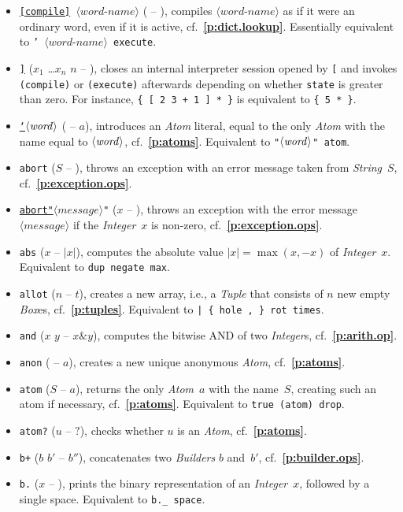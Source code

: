 \documentclass[12pt,oneside]{article}
\def\refpoint#1{{\rm\textbf{\ref{#1}}}}
\let\ptref=\refpoint
\begin{document}
\begin{itemize}
\item {\tt \underline{[compile]} $\langle\textit{word-name}\rangle$} ( -- ), compiles $\langle\textit{word-name}\rangle$ as if it were an ordinary word, even if it is active, cf.~\ptref{p:dict.lookup}. Essentially equivalent to {\tt ' $\langle\textit{word-name}\rangle$ execute}.
\item {\tt \underline{]}} ($x_1$ \dots $x_n$ $n$ -- ), closes an internal interpreter session opened by {\tt [} and invokes {\tt (compile)} or {\tt (execute)} afterwards depending on whether {\tt state} is greater than zero. For instance, {\tt \{ [ 2 3 + 1 ] * \}} is equivalent to {\tt \{ 5 * \}}.
\item {\tt \underline{`}$\langle\textit{word\/}\rangle$} ( -- $a$), introduces an {\em Atom\/} literal, equal to the only {\em Atom\/} with the name equal to $\langle\textit{word\/}\rangle$, cf.~\ptref{p:atoms}. Equivalent to {\tt "$\langle\textit{word\/}\rangle$" atom}. 
\item {\tt abort} ($S$ -- ), throws an exception with an error message taken from {\em String\/}~$S$, cf.~\ptref{p:exception.ops}.
\item {\tt \underline{abort"}$\langle\textit{message}\rangle$"} ($x$ -- ), throws an exception with the error message $\langle\textit{message}\rangle$ if the {\em Integer\/}~$x$ is non-zero, cf.~\ptref{p:exception.ops}.
\item {\tt abs} ($x$ -- $|x|$), computes the absolute value $|x|=\max(x,-x)$ of {\em Integer\/}~$x$. Equivalent to {\tt dup negate max}.
\item {\tt allot} ($n$ -- $t$), creates a new array, i.e., a {\em Tuple\/} that consists of $n$ new empty {\em Box\/}es, cf.~\ptref{p:tuples}. Equivalent to {\tt | \{ hole , \} rot times}.
\item {\tt and} ($x$ $y$ -- $x\& y$), computes the bitwise AND of two {\em Integer\/}s, cf.~\ptref{p:arith.op}.
\item {\tt anon} ( -- $a$), creates a new unique anonymous {\em Atom}, cf.~\ptref{p:atoms}.
\item {\tt atom} ($S$ -- $a$), returns the only {\em Atom\/}~$a$ with the name~$S$, creating such an atom if necessary, cf.~\ptref{p:atoms}. Equivalent to {\tt true (atom) drop}.
\item {\tt atom?} ($u$ -- $?$), checks whether $u$ is an {\em Atom}, cf.~\ptref{p:atoms}.
\item {\tt b+} ($b$ $b'$ -- $b''$), concatenates two {\em Builders\/} $b$ and~$b'$, cf.~\ptref{p:builder.ops}.
\item {\tt b.} ($x$ -- ), prints the binary representation of an {\em Integer\/}~$x$, followed by a single space. Equivalent to {\tt b.\_ space}.

\end{itemize}
\end{document}
